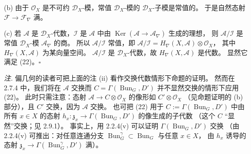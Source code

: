 (b) 由于 $\mathcal{O}_X$ 是不可约 $\mathcal{D}_X$-模，常值 $\mathcal{D}_X$-模的 $\mathcal{D}_X$-子模是常值的。
于是自然态射 $\mathcal{F}\to\mathcal{F}_\nabla$ 满。

(c) 若 $\mathcal{A}$ 是 $\mathcal{D}_X$-代数，$\mathcal{I}$ 是 $\mathcal{A}$ 中由
$\operatorname{Ker}(\mathcal{A}\to\mathcal{A}_\nabla)$ 生成的理想，
则 $\mathcal{A}/\mathcal{I}$ 是常值 $\mathcal{D}_X$-模 $\mathcal{A}_\nabla$ 的商。
所以 $\mathcal{A}/\mathcal{I}$ 常值，即 $\mathcal{A}/\mathcal{I}=H_\nabla(X,\mathcal{A})\otimes\mathcal{O}_X$，
其中 $H_\nabla(X,\mathcal{A})$ 为某向量空间。
$\mathcal{A}/\mathcal{I}$ 是 $\mathcal{D}_X$-代数，故 $H_\nabla(X,\mathcal{A})$ 是代数。
显然它满足 (22)。\hfill$\square$

\emph{注.} 偏几何的读者可把上面的注 (ii) 看作交换代数情形下命题的证明。
然而在 2.7.4 中，我们将在 $\mathcal{A}$ 交换而 $C=\Gamma(\operatorname{Bun}_G,D')$ 并不显然交换的情形下应用 (22)。
此时只需注意：态射 $\mathcal{A}\to C\otimes\mathcal{O}_X$ 的像形如 $C'\otimes\mathcal{O}_X$
（见命题证明的 (b) 部分），且 $C'$ 交换，因为 $\mathcal{A}$ 交换。
也可把 (22) 用于 $C:=\Gamma(\operatorname{Bun}_G,D')$ 中由所有 $x\in X$ 的态射
$h_x: \mathfrak{z}_x\to\Gamma(\operatorname{Bun}_G,D')$ 的像生成的子代数
（这个 $C$ “显然”交换；见 2.9.1）。
事实上，用 2.2.4(v) 可以证明 $\Gamma(\operatorname{Bun}_G,D')$ 交换
（由 2.2.4(v) 可推出：对任意连通分支
$\operatorname{Bun}_G^\gamma\subset\operatorname{Bun}_G$ 与任意 $x\in X$，
由 $h_x$ 诱导的态射 $\mathfrak{z}_x\to\Gamma(\operatorname{Bun}_G^\gamma,D')$ 满）。

